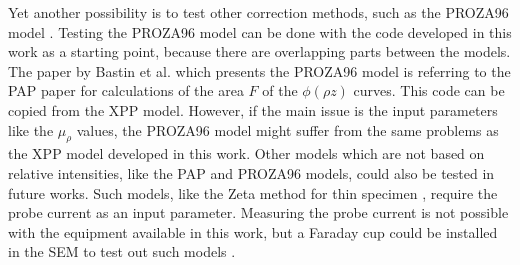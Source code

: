 Yet another possibility is to test other correction methods, such as the PROZA96 model \cite{bastin_proza96_1998}.
Testing the PROZA96 model can be done with the code developed in this work as a starting point, because there are overlapping parts between the models.
The paper by Bastin et al. \cite{bastin_proza96_1998} which presents the PROZA96 model is referring to the PAP paper for calculations of the area $F$ of the $\phi(\rho z)$ curves.
This code can be copied from the XPP model.
However, if the main issue is the input parameters like the $\mu_\rho$ values, the PROZA96 model might suffer from the same problems as the XPP model developed in this work.
Other models which are not based on relative intensities, like the PAP and PROZA96 models, could also be tested in future works.
Such models, like the Zeta method for thin specimen \cite[Ch. 35.5]{williams_carter_tem_2009}, require the probe current as an input parameter.
Measuring the probe current is not possible with the equipment available in this work, but a Faraday cup could be installed in the SEM to test out such models \cite{goldstein_scanning_2018}.



